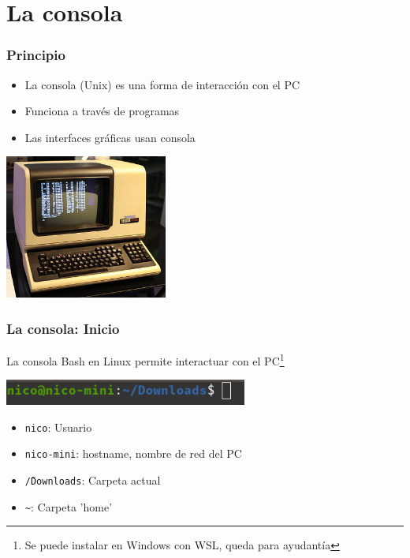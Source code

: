 \documentclass[14pt,aspectratio=169,xcolor=dvipsnames]{beamer}
\begin{document}
\section{La consola}
\begin{frame}\frametitle{Principio}
    \begin{itemize}
        \item La consola (Unix) es una forma de interacción con el PC
        \item Funciona a través de programas
        \item Las interfaces gráficas usan consola
    \end{itemize}
    \begin{flushright}
        \includegraphics[width=0.4\textwidth]{../images/os-unix.png}
    \end{flushright}
\end{frame}
\begin{frame}\frametitle{La consola: Inicio}
La consola Bash en Linux permite interactuar con el PC\footnote{Se puede instalar en Windows con WSL, queda para ayudantía}

    \begin{center}
        \includegraphics[width=0.6\textwidth]{../images/consola.png}
    \end{center}
\begin{itemize}
    \item \texttt{nico}: Usuario
    \item \texttt{nico-mini}: hostname, nombre de red del PC
    \item \texttt{\~/Downloads}: Carpeta actual
    \item \texttt{\~}: Carpeta 'home'
\end{itemize}
\end{frame}
\end{document}
